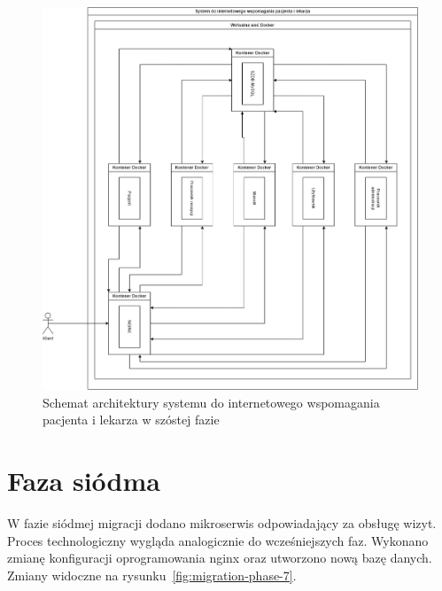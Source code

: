 \documentclass[12pt,twoside]{book}
\newcommand{\captionvspace}{\vspace{6pt}}
\begin{document}
    \begin{figure}[ht]
        \centering
        \includegraphics[width=\textwidth]{includes/images/migration-phase-6.png}
        \captionvspace
        \caption{Schemat architektury systemu do internetowego wspomagania pacjenta i lekarza w szóstej fazie}
        \label{fig:migration-phase-6}
    \end{figure}


    \section{Faza siódma}
    W fazie siódmej migracji dodano mikroserwis odpowiadający za obsługę wizyt. Proces technologiczny wygląda analogicznie do wcześniejszych faz. Wykonano zmianę konfiguracji oprogramowania nginx oraz utworzono nową bazę danych. Zmiany widoczne na rysunku~\ref{fig:migration-phase-7}.
\end{document}
